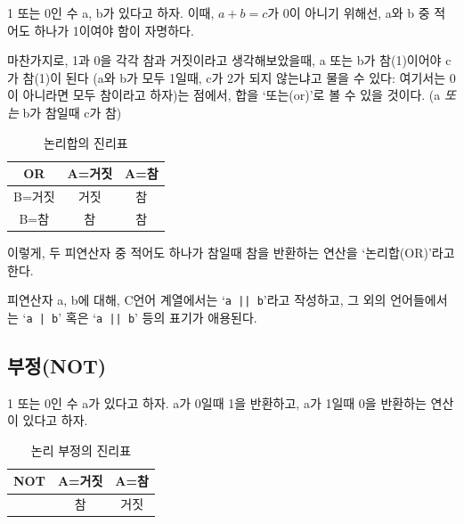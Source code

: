 \documentclass[a4paper,12pt]{book}
\newcommand{\Ve}[1]{\Verb+#1+}
\begin{document}
\begin{appendices}
        1 또는 0인 수 a, b가 있다고 하자.
        이때, $a + b = c$가 0이 아니기 위해선,
        a와 b 중 적어도 하나가 1이여야 함이 자명하다.

        마찬가지로, 1과 0을 각각 참과 거짓이라고 생각해보았을때,
        a 또는 b가 참(1)이어야 c가 참(1)이 된다
        (a와 b가 모두 1일때, c가 2가 되지 않는냐고 물을 수 있다:
        여기서는 0이 아니라면 모두 참이라고 하자)는 점에서,
        합을 `또는(or)'로 볼 수 있을 것이다.
        ({a \textit{또는} b}가 참일때 c가 참)

        \begin{table}[H]
            \centering

            \caption{논리합의 진리표}

            \begin{tabular}{ || c || c | c || }
                \hline
                OR    & A=거짓 & A=참 \\
                \hline\hline
                B=거짓 &   거짓 &   참 \\
                \hline
                B=참   &    참 &   참 \\
                \hline
            \end{tabular}
        \end{table}

        이렇게, 두 피연산자 중 적어도 하나가 참일때 참을 반환하는 연산을 `논리합(OR)'라고 한다.

        피연산자 a, b에 대해, C언어 계열에서는 `\Ve{a || b}'라고 작성하고,
        그 외의 언어들에서는 `\Ve{a | b}' 혹은 `\Ve{a || b}' 등의 표기가 애용된다.


    \subsection{부정(NOT)}

        1 또는 0인 수 a가 있다고 하자.
        a가 0일때 1을 반환하고,
        a가 1일때 0을 반환하는 연산이 있다고 하자.

        \begin{table}[H]
            \centering

            \caption{논리 부정의 진리표}

            \begin{tabular}{ || c || c | c || }
                \hline
                NOT & A=거짓 & A=참 \\
                \hline\hline
                    &     참 & 거짓 \\
                \hline
            \end{tabular}
        \end{table}


\end{appendices}
\end{document}
